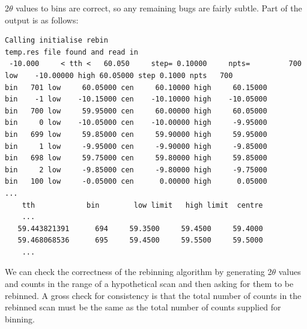 \documentclass[10pt,a4paper,notitlepage]{article}
\begin{document}
2$\theta$ values to bins are correct, so any remaining bugs are fairly
subtle.
Part of the output is as follows:
\begin{verbatim}
Calling initialise rebin
temp.res file found and read in
 -10.000     < tth <   60.050     step= 0.10000     npts=         700
low    -10.00000 high 60.05000 step 0.1000 npts   700
bin   701 low     60.05000 cen     60.10000 high     60.15000
bin    -1 low    -10.15000 cen    -10.10000 high    -10.05000
bin   700 low     59.95000 cen     60.00000 high     60.05000
bin     0 low    -10.05000 cen    -10.00000 high     -9.95000
bin   699 low     59.85000 cen     59.90000 high     59.95000
bin     1 low     -9.95000 cen     -9.90000 high     -9.85000
bin   698 low     59.75000 cen     59.80000 high     59.85000
bin     2 low     -9.85000 cen     -9.80000 high     -9.75000
bin   100 low     -0.05000 cen      0.00000 high      0.05000
...
    tth            bin        low limit   high limit  centre
    ...
   59.443821391      694     59.3500     59.4500     59.4000
   59.468068536      695     59.4500     59.5500     59.5000
    ...
\end{verbatim}

We can check the correctness of the rebinning algorithm by generating 
2$\theta$ values and counts in the range of a hypothetical scan and then 
asking for them to be rebinned. 
A gross check for consistency is that the total number of counts in the 
rebinned scan must be the same as the total number of counts supplied 
for binning.
\end{document}
